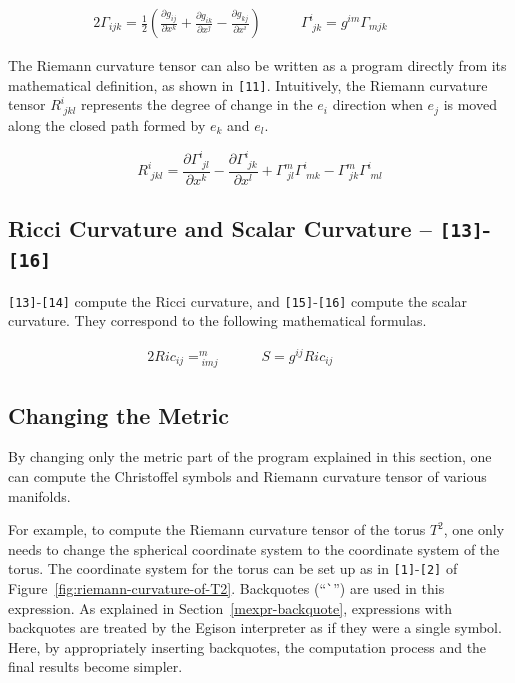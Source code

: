 \begin{alignat*}{2}
\Gamma_{ijk} = \frac{1}{2} (\frac{\partial g_{ij}}{\partial x^k} + \frac{\partial g_{ik}}{\partial x^j} - \frac{\partial g_{kj}}{\partial x^i}) &\qquad
\Gamma^{i}_{\;jk} = g^{im} \Gamma_{mjk} &\qquad
\end{alignat*}

The Riemann curvature tensor can also be written as a program directly from its mathematical definition, as shown in \texttt{[11]}.
Intuitively, the Riemann curvature tensor $R^{i}_{\;jkl}$ represents the degree of change in the $e_i$ direction when $e_j$ is moved along the closed path formed by $e_k$ and $e_l$.

\[R^{i}_{\;jkl} = \frac{\partial \Gamma^{i}_{\;jl}}{\partial x^k} - \frac{\partial \Gamma^{i}_{\;jk}}{\partial x^l} + \Gamma^{m}_{\;jl} \Gamma^{i}_{\;mk} - \Gamma^{m}_{\;jk} \Gamma^{i}_{\;ml} \]

\subsection{Ricci Curvature and Scalar Curvature -- \texttt{[13]}-\texttt{[16]}}

\texttt{[13]}-\texttt{[14]} compute the Ricci curvature, and \texttt{[15]}-\texttt{[16]} compute the scalar curvature.
They correspond to the following mathematical formulas.

\begin{alignat*}{2}
Ric_{ij} = ^{m}_{\;imj} &\qquad
S = g^{ij} Ric_{ij} &\qquad
\end{alignat*}


\subsection{Changing the Metric}

By changing only the metric part of the program explained in this section, one can compute the Christoffel symbols and Riemann curvature tensor of various manifolds.

For example, to compute the Riemann curvature tensor of the torus $T^2$, one only needs to change the spherical coordinate system to the coordinate system of the torus.
The coordinate system for the torus can be set up as in \texttt{[1]}-\texttt{[2]} of Figure~\ref{fig:riemann-curvature-of-T2}.
Backquotes (``\lstinline|`|'') are used in this expression.
As explained in Section~\ref{mexpr-backquote}, expressions with backquotes are treated by the Egison interpreter as if they were a single symbol.
Here, by appropriately inserting backquotes, the computation process and the final results become simpler.

